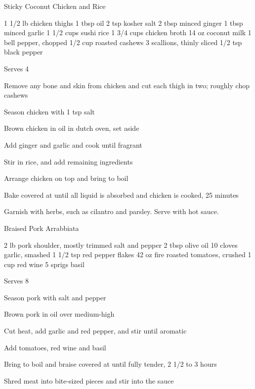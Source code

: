 \begin{denserecipe}{Sticky Coconut Chicken and Rice}{}
\begin{ingredients}
1 1/2 lb chicken thighs
1 tbsp oil
2 tsp kosher salt
2 tbsp minced ginger
1 tbsp minced garlic
1 1/2 cups sushi rice
1 3/4 cups chicken broth
14 oz coconut milk
1 bell pepper, chopped
1/2 cup roasted cashews
3 scallions, thinly sliced
1/2 tsp black pepper
\end{ingredients}
\nextcolumn
Serves 4
\begin{steps}
    \item Remove any bone and skin from chicken and cut each thigh in two; roughly chop cashews
    \item Season chicken with 1 tsp salt
    \item Brown chicken in oil in dutch oven, set aside
    \item Add ginger and garlic and cook until fragrant
    \item Stir in rice, and add remaining ingredients
    \item Arrange chicken on top and bring to boil
    \item Bake covered at  until all liquid is absorbed and chicken is cooked, 25 minutes
\end{steps}
Garnish with herbs, such as cilantro and parsley. Serve with hot sauce.
\end{denserecipe}

\begin{recipe}{Braised Pork Arrabbiata}{}
\begin{ingredients}
2 lb pork shoulder, mostly trimmed
salt and pepper
2 tbsp olive oil
10 cloves garlic, smashed
1 1/2 tsp red pepper flakes
42 oz fire roasted tomatoes, crushed
1 cup red wine
5 sprigs basil
\end{ingredients}
\nextcolumn
Serves 8
\begin{steps}
    \item Season pork with salt and pepper
    \item Brown pork in oil over medium-high
    \item Cut heat, add garlic and red pepper, and stir until aromatic
    \item Add tomatoes, red wine and basil
    \item Bring to boil and braise covered at  until fully tender, 2 1/2 to 3 hours
    \item Shred meat into bite-sized pieces and stir into the sauce
\end{steps}
\end{recipe}

